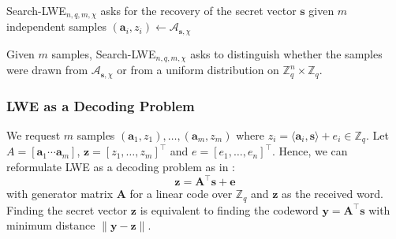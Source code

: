 \documentclass[
  a4paper,  %
  twoside,  %
  bibliography=totoc,
  headsepline,
  cleardoublepage=empty,
  parskip=half,
  draft=false
]{scrbook}
\begin{document}
\begin{definition} %
  Search-LWE$_{n, q, m, \chi}$ asks for the recovery of the secret vector $\mathbf{s}$ given $m$ independent samples $(\mathbf{a}_i, z_i) \leftarrow \mathcal{A}_{\mathbf{s}, \chi}$ %
\end{definition}

\begin{definition}
  Given $m$ samples, Search-LWE$_{n, q, m, \chi}$ asks to distinguish whether the samples were drawn from  $\mathcal{A}_{\mathbf{s}, \chi}$ or from a uniform distribution on $\mathbb{Z}_q^n \times \mathbb{Z}_q$.
\end{definition}

\subsubsection{LWE as a Decoding Problem} \label{sec:lwe-decoding}
We request $m$ samples $(\mathbf{a}_1, z_1), \ldots, (\mathbf{a}_m, z_m)$ where $z_i = \langle \mathbf{a}_i, \mathbf{s} \rangle + e_i \in \mathbb{Z}_q$. Let $A = \left[ \mathbf{a}_1 \cdots \mathbf{a}_m\right]$, $\mathbf{z} = \left[z_1, \ldots, z_m\right]^\intercal$ and $e = \left[e_1, \ldots, e_n\right]^\intercal$. Hence, we can reformulate LWE as a decoding problem as in \cite{GJS15}:
\begin{equation} \label{eq:lwe-decoding}
  \mathbf{z} =  \mathbf{A}^\intercal \mathbf{s} + \mathbf{e}
\end{equation} %
with generator matrix $\mathbf{A}$ for a linear code over $\mathbb{Z}_q$ and $\mathbf{z}$ as the received word. Finding the secret vector $\mathbf{z}$ is equivalent to finding the codeword $\mathbf{y} = \mathbf{A}^\intercal\mathbf{s}$ with minimum distance $\| \mathbf{y} - \mathbf{z} \|$.
\end{document}
